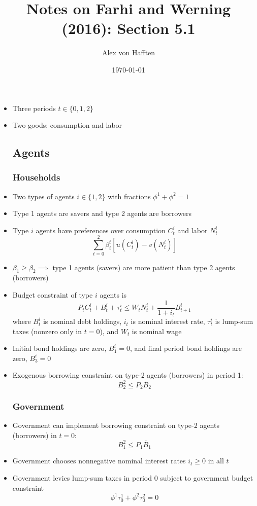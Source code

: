\documentclass{article}
\title{Notes on Farhi and Werning (2016): Section 5.1}
\author{Alex von Hafften}
\date{\today}
\begin{document}
\maketitle

\begin{itemize}

\section{Environment}
\subsection{Timing}
\item Three periods $t \in \{0,1,2\}$
\item Two goods: consumption and labor
\subsection{Agents}
\subsubsection{Households}
\item Two types of agents $i \in \{1, 2\}$ with fractions $\phi^1 + \phi^2 = 1$ 
\item Type 1 agents are savers and type 2 agents are borrowers
\item Type $i$ agents have preferences over consumption $C_t^i$ and labor $N_t^i$
$$
\sum_{t=0}^2 \beta_i^t [u(C_t^i) - v(N_t^i)]
$$
\item $\beta_1 \ge \beta_2 \implies$ type 1 agents (savers) are more patient than type 2 agents (borrowers)
\item Budget constraint of type $i$ agents is
$$
P_t C_t^i + B_t^i + \tau_t^i \le W_t N_t^i + \frac{1}{1 + i_t} B_{t+1}^i
$$
where $B_t^i$ is nominal debt holdings, $i_t$ is nominal interest rate, $\tau_t^i$ is lump-sum taxes (nonzero only in $t=0$), and $W_t$ is nominal wage
\item Initial bond holdings are zero, $B_1^i = 0$, and final period bond holdings are zero, $B_3^i = 0$
\item Exogenous borrowing constraint on type-2 agents (borrowers) in period 1:
$$
B_2^2 \le P_2 \bar B_2
$$
\subsubsection{Government}
\item Government can implement borrowing constraint on type-2 agents (borrowers) in $t=0$:
$$
B_1^2 \le P_1 \bar B_1
$$
\item Government chooses nonnegative nominal interest rates $i_t\ge 0$ in all $t$
\item Government levies lump-sum taxes in period 0 subject to government budget constraint
$$
\phi^1\tau^1_0 + \phi^2\tau^2_0 = 0
$$

\end{itemize}
\end{document}
